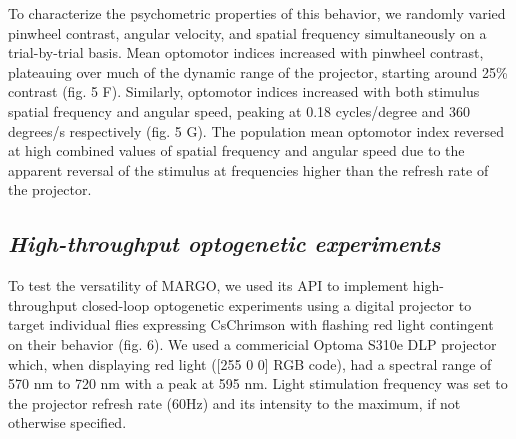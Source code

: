 \documentclass[12pt,letterpaper]{article}
\begin{document}
To characterize the psychometric properties of this behavior, we randomly varied pinwheel contrast, angular velocity, and spatial frequency simultaneously on a trial-by-trial basis. Mean optomotor indices increased with pinwheel contrast, plateauing over much of the dynamic range of the projector, starting around 25\% contrast (fig. 5 F). Similarly, optomotor indices increased with both stimulus spatial frequency and angular speed, peaking at 0.18 cycles/degree and 360 degrees/s respectively (fig. 5 G). The population mean optomotor index reversed at high combined values of spatial frequency and angular speed due to the apparent reversal of the stimulus at frequencies higher than the refresh rate of the projector.

\subsection*{\textit{High-throughput optogenetic experiments}}

To test the versatility of MARGO, we used its API to implement high-throughput closed-loop optogenetic experiments using a digital projector to target individual flies expressing CsChrimson \cite{griebel_2014,Klapoetke_Independent_2014} with flashing red light contingent on their behavior (fig. 6). We used a commericial Optoma S310e DLP projector which, when displaying red light ([255 0 0] RGB code), had a spectral range of 570 nm to 720 nm with a peak at 595 nm. Light stimulation frequency was set to the projector refresh rate (60Hz) and its intensity to the maximum, if not otherwise specified.
\end{document}

